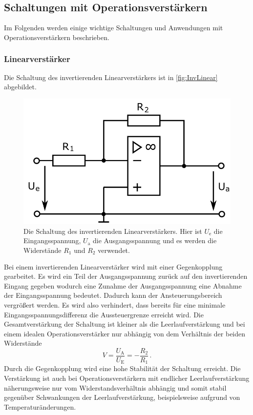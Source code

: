 \newpage
\subsection{Schaltungen mit Operationsverstärkern}
\label{sec:Schaltungen}

Im Folgenden werden einige wichtige Schaltungen und Anwendungen mit Operationsverstärkern beschrieben.

\subsubsection{Linearverstärker}
\label{sec:linearverstaerker}
Die Schaltung des invertierenden Linearverstärkers ist in \autoref{fig:InvLinear} abgebildet.

\begin{figure}
    \centering
    \includegraphics[width=0.6\linewidth]{./figures/1_InvLinear.jpeg}
    \caption{Die Schaltung des invertierenden Linearverstärkers. Hier ist $U_\text{e}$ die Eingangsspannung, $U_\text{a}$ die Ausgangsspannung und es werden die Widerstände $R_1$ und $R_2$ verwendet. \cite{V51}}
    \label{fig:InvLinear}
\end{figure}

Bei einem invertierenden Linearverstärker wird mit einer Gegenkopplung gearbeitet. Es wird ein Teil der Ausgangsspannung zurück auf den invertierenden Eingang gegeben wodurch eine Zunahme der Ausgangsspannung eine Abnahme der Eingangsspannung bedeutet. Dadurch kann der Ansteuerungsbereich vergrößert werden. Es wird also verhindert, dass bereits für eine minimale Eingangsspannungsdifferenz die Aussteuergrenze erreicht wird. Die Gesamtverstärkung der Schaltung ist kleiner als die Leerlaufverstärkung und bei einem idealen Operationsverstärker nur abhängig von dem Verhältnis der beiden Widerstände
\begin{equation*}
    V = \frac{U_\text{A}}{U_\text{E}} = - \frac{R_2}{R_1} \, .
\end{equation*}
Durch die Gegenkopplung wird eine hohe Stabilität der Schaltung erreicht. Die Verstärkung ist auch bei Operationsverstärkern mit endlicher Leerlaufverstärkung näherungsweise nur vom Widerstandsverhältnis abhängig und somit stabil gegenüber Schwankungen der Leerlaufverstärkung, beispielsweise aufgrund von Temperaturänderungen.

